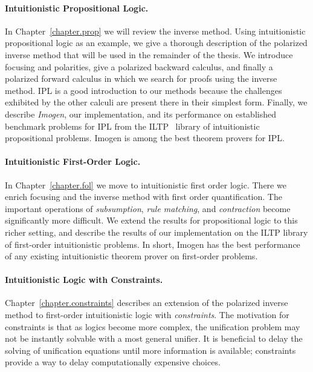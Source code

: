 \paragraph{Intuitionistic Propositional Logic.}
In Chapter~\ref{chapter.prop} we will review the inverse method.  Using
intuitionistic propositional logic as an example, we give a thorough description
of the polarized inverse method that will be used in the remainder of the
thesis.  We introduce focusing and polarities, give a polarized backward
calculus, and finally a polarized forward calculus in which we search for proofs
using the inverse method.  IPL is a good introduction to our methods because the
challenges exhibited by the other calculi are present there in their simplest
form.  Finally, we describe \emph{Imogen}, our implementation, and its
performance on established benchmark problems for IPL from the
ILTP~\cite{Raths.2007.JAR} library of intuitionistic propositional problems.
Imogen is among the best theorem provers for IPL.

\paragraph{Intuitionistic First-Order Logic.}
In Chapter~\ref{chapter.fol} we move to intuitionistic first order
logic.  There we enrich focusing and the
inverse method with first order quantification.  The important
operations of \emph{subsumption}, \emph{rule matching}, and
\emph{contraction} become significantly more difficult.  We extend the
results for propositional logic to this richer setting, and describe
the results of our implementation on the ILTP library of first-order
intuitionistic problems.  In short, Imogen has the best performance
of any existing intuitionistic theorem prover on first-order problems.

\paragraph{Intuitionistic Logic with Constraints.}
Chapter~\ref{chapter.constraints} describes an extension of the polarized inverse
method to first-order
intuitionistic logic with \emph{constraints}.  The motivation for constraints is
that as logics become more complex, the unification problem may not be instantly
solvable with a most general unifier.  It is beneficial to delay the solving of
unification equations until more information is available;  constraints provide
a way to delay computationally expensive choices.

